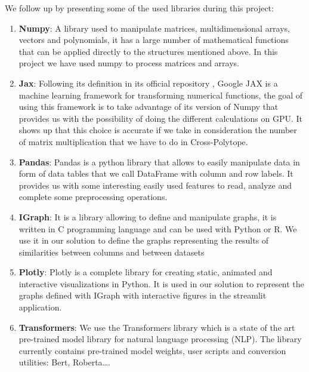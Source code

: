 We follow up by presenting some of the used libraries during this project:

\begin{enumerate}
    \item \textbf{Numpy}:
A library used to manipulate matrices, multidimensional arrays, vectors and
polynomials, it has a large number of mathematical functions that can be applied
directly to the structures mentioned above. In this project we have used numpy
to process matrices and arrays.
    
    \item \textbf{Jax}:
Following its definition in its official repository \citep{jax_2022}, Google JAX
is a machine learning framework for transforming numerical functions, the goal
of using this framework is to take advantage of its version of Numpy that
provides us with the possibility of doing the different calculations on GPU. It
shows up that this choice is accurate if we take in consideration the number of
matrix multiplication that we have to do in Cross-Polytope.

    \item \textbf{Pandas}:
Pandas is a python library that allows to easily manipulate data in form of data
tables that we call DataFrame with column and row labels. It provides us with
some interesting easily used features to read, analyze and complete some
preprocessing operations.

    \item \textbf{IGraph}:
It is a library allowing to define and manipulate graphs, it is written in C
programming language and can be used with Python or R. We use it in our solution
to define the graphs representing the results of similarities between columns
and between datasets

    \item \textbf{Plotly}:
Plotly is a complete library for creating static, animated and interactive
visualizations in Python. It is used in our solution to represent the graphs
defined with IGraph with interactive figures in the streamlit application.

    \item \textbf{Transformers}:
We use the Transformers library which is a state of the art pre-trained model
library for natural language processing (NLP). The library currently contains
pre-trained model weights, user scripts and conversion utilities: Bert,
Roberta\ldots.

\end{enumerate}


